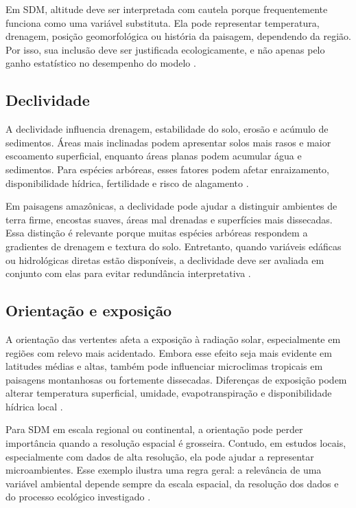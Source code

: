 Em SDM, altitude deve ser interpretada com cautela porque frequentemente funciona como uma variável substituta. Ela pode representar temperatura, drenagem, posição geomorfológica ou história da paisagem, dependendo da região. Por isso, sua inclusão deve ser justificada ecologicamente, e não apenas pelo ganho estatístico no desempenho do modelo \parencite{elith2009species,franklin2010mapping}.

\subsection{Declividade}

A declividade influencia drenagem, estabilidade do solo, erosão e acúmulo de sedimentos. Áreas mais inclinadas podem apresentar solos mais rasos e maior escoamento superficial, enquanto áreas planas podem acumular água e sedimentos. Para espécies arbóreas, esses fatores podem afetar enraizamento, disponibilidade hídrica, fertilidade e risco de alagamento \parencite{guisan2017habitat,tuomisto2019diversity}.

Em paisagens amazônicas, a declividade pode ajudar a distinguir ambientes de terra firme, encostas suaves, áreas mal drenadas e superfícies mais dissecadas. Essa distinção é relevante porque muitas espécies arbóreas respondem a gradientes de drenagem e textura do solo. Entretanto, quando variáveis edáficas ou hidrológicas diretas estão disponíveis, a declividade deve ser avaliada em conjunto com elas para evitar redundância interpretativa \parencite{franklin2010mapping}.

\subsection{Orientação e exposição}

A orientação das vertentes afeta a exposição à radiação solar, especialmente em regiões com relevo mais acidentado. Embora esse efeito seja mais evidente em latitudes médias e altas, também pode influenciar microclimas tropicais em paisagens montanhosas ou fortemente dissecadas. Diferenças de exposição podem alterar temperatura superficial, umidade, evapotranspiração e disponibilidade hídrica local \parencite{guisan2017habitat}.

Para SDM em escala regional ou continental, a orientação pode perder importância quando a resolução espacial é grosseira. Contudo, em estudos locais, especialmente com dados de alta resolução, ela pode ajudar a representar microambientes. Esse exemplo ilustra uma regra geral: a relevância de uma variável ambiental depende sempre da escala espacial, da resolução dos dados e do processo ecológico investigado \parencite{wiens1989spatial,elith2009species}.

